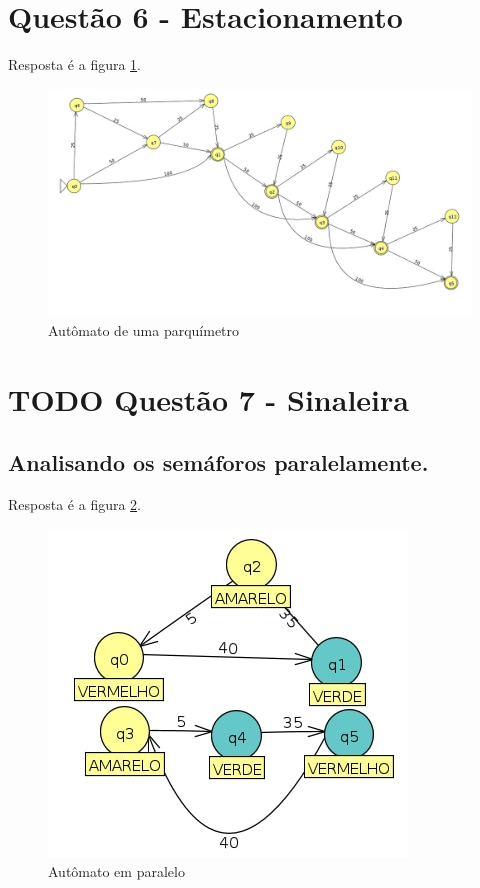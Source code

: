 \documentclass[11pt]{article}
\begin{document}
\section{Questão 6 - Estacionamento}
\label{sec:org1b79f74}
Resposta é a figura \ref{fig:org5e3f203}.
\begin{figure}[htbp]
\centering
\includegraphics[width=.9\linewidth]{./q6/estacionamento.jpg}
\caption{\label{fig:org5e3f203}
Autômato de uma parquímetro}
\end{figure}
\section{{\bfseries\sffamily TODO} Questão 7 - Sinaleira}
\label{sec:org734c724}
\subsection{Analisando os semáforos paralelamente.}
\label{sec:orgf5e5c95}

Resposta é a figura \ref{fig:orgc975c3e}.
\begin{figure}[htbp]
\centering
\includegraphics[width=.9\linewidth]{./q7/paralelo.jpg}
\caption{\label{fig:orgc975c3e}
Autômato em paralelo}
\end{figure}
\end{document}
